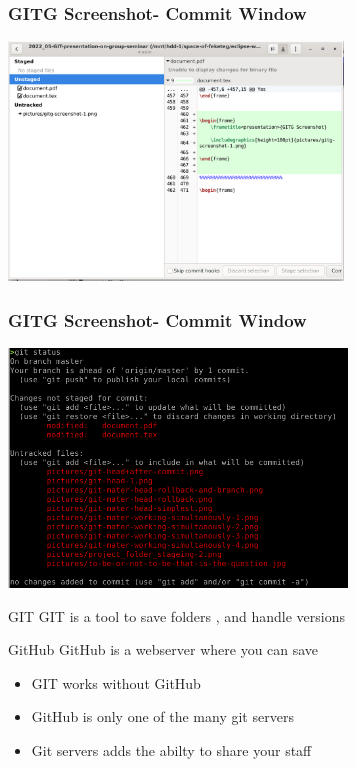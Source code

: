 \documentclass[aspectratio=169]{beamer}
\begin{document}
\begin{frame}
	\frametitle<presentation>{GITG Screenshot- Commit Window}
	
	\includegraphics[height=180pt]{pictures/gitg-screenshot-2.png}
		
\end{frame}

\begin{frame}
	\frametitle<presentation>{GITG Screenshot- Commit Window}
	
	\includegraphics[height=180pt]{pictures/CLI-git-status.png}
		
\end{frame}




\begin{frame}

\begin{block}{GIT}
GIT is a  tool to save folders , and handle versions
\end{block}


\begin{block}{GitHub}
GitHub is a webserver where you can save 
\end{block}



\begin{itemize}
\item GIT works without GitHub
\item GitHub is only one of the many git servers
\item Git servers adds the abilty to share your staff
\end{itemize}
 
\end{frame}
\end{document}

